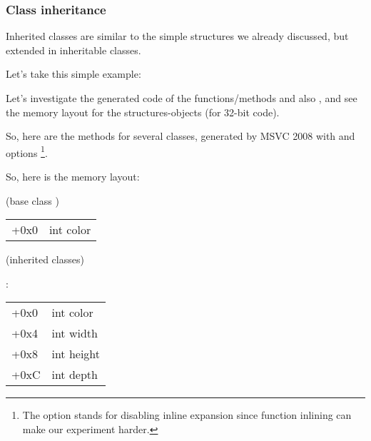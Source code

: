 \subsubsection{Class inheritance}
\label{cpp_inheritance}


Inherited classes are similar to the simple structures we already discussed, but extended 
in inheritable classes.

Let's take this simple example:




Let's investigate the generated code of the  functions/methods and also ,
and see the memory layout for the structures-objects (for 32-bit code).


So, here are the  methods for several classes, generated by MSVC 2008 with \Ox and \Obzero options
\footnote{
The \Obzero option stands for disabling inline expansion since function inlining
can make our experiment harder.}.







So, here is the memory layout:

(base class )

\begin{center}
\begin{tabular}{ | l | l | }
\hline
  \tableheader{} \\
\hline
  +0x0 & int color \\
\hline
\end{tabular}
\end{center}

(inherited classes)

:

\begin{center}
\begin{tabular}{ | l | l | }
\hline
  \tableheader{} \\
\hline
  +0x0 & int color \\
\hline
  +0x4 & int width \\
\hline
  +0x8 & int height \\
\hline
  +0xC & int depth \\
\hline
\end{tabular}
\end{center}

